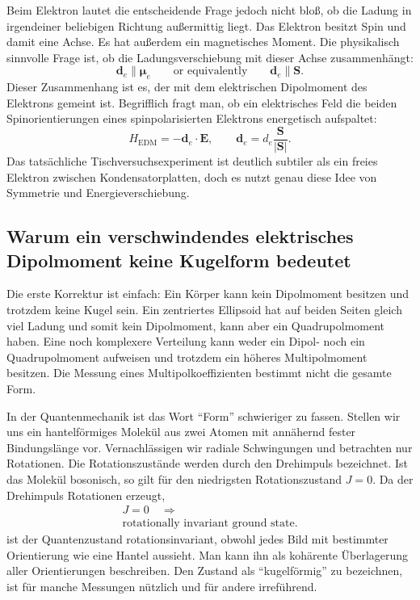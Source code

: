 Beim Elektron lautet die entscheidende Frage jedoch nicht bloß, ob die Ladung in irgendeiner beliebigen Richtung außermittig liegt. Das Elektron besitzt Spin und damit eine Achse. Es hat außerdem ein magnetisches Moment. Die physikalisch sinnvolle Frage ist, ob die Ladungsverschiebung mit dieser Achse zusammenhängt:
\begin{equation}
\mathbf d_e \parallel \boldsymbol{\mu}_e
\qquad \text{or equivalently} \qquad
\mathbf d_e \parallel \mathbf S .
\end{equation}
Dieser Zusammenhang ist es, der mit dem elektrischen Dipolmoment des Elektrons gemeint ist. Begrifflich fragt man, ob ein elektrisches Feld die beiden Spinorientierungen eines spinpolarisierten Elektrons energetisch aufspaltet:
\begin{equation}
H_{\mathrm{EDM}}=-\mathbf d_e\cdot \mathbf E,
\qquad
\mathbf d_e=d_e\frac{\mathbf S}{|\mathbf S|}.
\end{equation}
Das tatsächliche Tischversuchsexperiment ist deutlich subtiler als ein freies Elektron zwischen Kondensatorplatten, doch es nutzt genau diese Idee von Symmetrie und Energieverschiebung.

\subsection{Warum ein verschwindendes elektrisches Dipolmoment keine Kugelform bedeutet}

Die erste Korrektur ist einfach: Ein Körper kann kein Dipolmoment besitzen und trotzdem keine Kugel sein. Ein zentriertes Ellipsoid hat auf beiden Seiten gleich viel Ladung und somit kein Dipolmoment, kann aber ein Quadrupolmoment haben. Eine noch komplexere Verteilung kann weder ein Dipol- noch ein Quadrupolmoment aufweisen und trotzdem ein höheres Multipolmoment besitzen. Die Messung eines Multipolkoeffizienten bestimmt nicht die gesamte Form.

In der Quantenmechanik ist das Wort ``Form'' schwieriger zu fassen. Stellen wir uns ein hantelförmiges Molekül aus zwei Atomen mit annähernd fester Bindungslänge vor. Vernachlässigen wir radiale Schwingungen und betrachten nur Rotationen. Die Rotationszustände werden durch den Drehimpuls bezeichnet. Ist das Molekül bosonisch, so gilt für den niedrigsten Rotationszustand \(J=0\). Da der Drehimpuls Rotationen erzeugt,
\begin{equation}
\begin{gathered}
J=0 \quad\Longrightarrow\\
\text{rotationally invariant ground state.}
\end{gathered}
\end{equation}
ist der Quantenzustand rotationsinvariant, obwohl jedes Bild mit bestimmter Orientierung wie eine Hantel aussieht. Man kann ihn als kohärente Überlagerung aller Orientierungen beschreiben. Den Zustand als ``kugelförmig'' zu bezeichnen, ist für manche Messungen nützlich und für andere irreführend.

